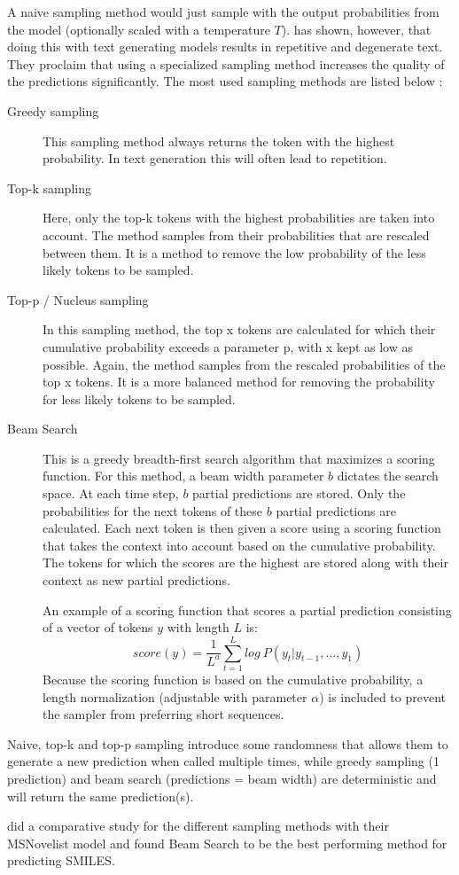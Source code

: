 A naive sampling method would just sample with the output probabilities from the model (optionally scaled with a temperature $T$). \textcite{holtzman2019curious} has shown, however, that doing this with text generating models results in repetitive and degenerate text. They proclaim that using a specialized sampling method increases the quality of the predictions significantly.
The most used sampling methods are listed below \cite{holtzman2019curious}:
\begin{description}
    \item[Greedy sampling] This sampling method always returns the token with the highest probability. In text generation this will often lead to repetition.
    \item[Top-k sampling] Here, only the top-k tokens with the highest probabilities are taken into account. The method samples from their probabilities that are rescaled between them. It is a method to remove the low probability of the less likely tokens to be sampled.
    \item[Top-p / Nucleus sampling] In this sampling method, the top x tokens are calculated for which their cumulative probability exceeds a parameter p, with x kept as low as possible. Again, the method samples from the rescaled probabilities of the top x tokens. It is a more balanced method for removing the probability for less likely tokens to be sampled.
    
    \item[Beam Search] \cite{freitag2017beam} This is a greedy breadth-first search algorithm that maximizes a scoring function.
    For this method, a beam width parameter $b$ dictates the search space. At each time step, $b$ partial predictions are stored.
    Only the probabilities for the next tokens of these $b$ partial predictions are calculated.
    Each next token is then given a score using a scoring function that takes the context into account based on the cumulative probability.
    The tokens for which the scores are the highest are stored along with their context as new partial predictions.

    An example of a scoring function that scores a partial prediction consisting of a vector of tokens $y$ with length $L$ is:
    \[score(y) = \frac{1}{L^a} \sum\limits_{t=1}^{L}log\ P(y_t | y_{t-1},\dots,y_{1})\]
    Because the scoring function is based on the cumulative probability, a length normalization (adjustable with parameter $\alpha$) is included to prevent the sampler from preferring short sequences.
    
\end{description}

Naive, top-k and top-p sampling introduce some randomness that allows them to generate a new prediction when called multiple times, while greedy sampling (1 prediction) and beam search (predictions = beam width) are deterministic and will return the same prediction(s).

\textcite{stravs2022msnovelist} did a comparative study for the different sampling methods with their MSNovelist model and found Beam Search to be the best performing method for predicting SMILES.
